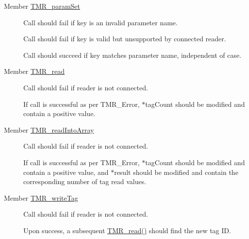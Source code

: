 \label{test__test000010}
\hypertarget{test__test000010}{}
 \begin{description}
\item[Member \hyperlink{group__reader_gd8c8030610870c694ff19b9733799dbb}{TMR\_\-paramSet} ]Call should fail if key is an invalid parameter name. 

Call should fail if key is valid but unsupported by connected reader. 

Call should succeed if key matches parameter name, independent of case. \end{description}


\label{test__test000005}
\hypertarget{test__test000005}{}
 \begin{description}
\item[Member \hyperlink{group__reader_gb477ff41498adaa35ca5cae932ecfc70}{TMR\_\-read} ]Call should fail if reader is not connected. 

If call is successful as per TMR\_\-Error, $\ast$tagCount should be modified and contain a positive value. \end{description}


\label{test__test000008}
\hypertarget{test__test000008}{}
 \begin{description}
\item[Member \hyperlink{group__reader_gcc9391a834e069adc7dca9e910f45c06}{TMR\_\-readIntoArray} ]Call should fail if reader is not connected. 

If call is successful as per TMR\_\-Error, $\ast$tagCount should be modified and contain a positive value, and $\ast$result should be modified and contain the corresponding number of tag read values. \end{description}


\label{test__test000009}
\hypertarget{test__test000009}{}
 \begin{description}
\item[Member \hyperlink{group__reader_g8f88f53e5ccb6d17cd430f0d7428f641}{TMR\_\-writeTag} ]Call should fail if reader is not connected. 

Upon success, a subsequent \hyperlink{group__reader_gb477ff41498adaa35ca5cae932ecfc70}{TMR\_\-read()} should find the new tag ID. \end{description}
